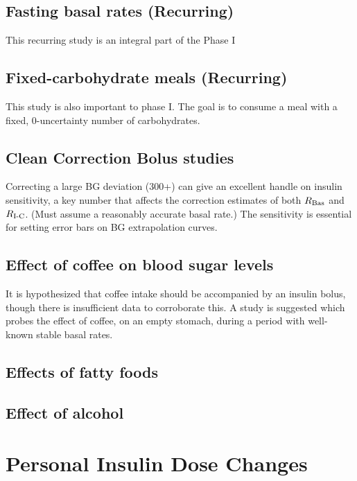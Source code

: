 \subsection{Fasting basal rates (Recurring)}

This recurring study is an integral part of the Phase I 

\subsection{Fixed-carbohydrate meals (Recurring)}

This study is also important to phase I. The goal is to consume a meal with a fixed, 0-uncertainty 
number of carbohydrates.

\subsection{Clean Correction Bolus studies}

Correcting a large BG deviation (300+) can give an excellent handle on insulin sensitivity, a key 
number that affects the correction estimates of both $R_\text{Bas}$ and $R_\text{I-C}$. (Must assume a reasonably 
accurate basal rate.) The sensitivity is essential for setting error bars on BG extrapolation curves.

\subsection{Effect of coffee on blood sugar levels}

It is hypothesized that coffee intake should be accompanied by an insulin bolus, though there is 
insufficient data to corroborate this. A study is suggested which probes the effect of coffee, on an 
empty stomach, during a period with well-known stable basal rates.

\subsection{Effects of fatty foods}

\subsection{Effect of alcohol}

\section{Personal Insulin Dose Changes}

